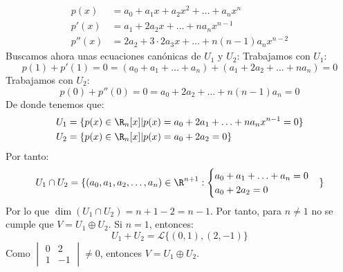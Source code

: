 \begin{ejercicio}
\begin{enumerate}
\begin{align*}
                    p(x) &= a_0 + a_1 x + a_2 x^2 + \ldots + a_n x^n \\
                    p'(x) &= a_1 + 2a_2 x + \ldots + na_n x^{n-1} \\
                    p''(x) &= 2a_2 + 3 \cdot 2 a_3 x + \ldots + n(n-1)a_n x^{n-2}
                \end{align*}
                Buscamos ahora unas ecuaciones canónicas de $U_1$ y $U_2$:
                Trabajamos con $U_1$:
                \begin{equation*}
                    p(1) + p'(1) = 0 = (a_0 + a_1 + \ldots + a_n) + (a_1 + 2a_2 + \ldots + na_n) = 0
                \end{equation*}
                Trabajamos con $U_2$:
                \begin{equation*}
                    p(0) + p''(0) = 0 = a_0 + 2a_2 + \ldots + n(n-1)a_n = 0
                \end{equation*}
                De donde tenemos que:
                \begin{align*}
                    U_1 &= \{p(x) \in \R_n[x] | p(x) = a_0 + 2a_1  + \ldots + na_n x^{n-1} = 0\}
                    \\ U_2 &= \{p(x) \in \R_n[x] | p(x) = a_0 + 2a_2 = 0\}
                \end{align*}
                Por tanto: 
                \begin{equation*}
                    U_1 \cap U_2 = \{ (a_0, a_1, a_2, \ldots, a_n) \in \R^{n+1} : \begin{cases}
                        a_0 + a_1 + \ldots + a_n = 0 \\
                        a_0 + 2a_2 = 0
                    \end{cases}
                    \} 
                \end{equation*}
                Por lo que $ \dim(U_1 \cap U_2) = n + 1 - 2 = n - 1$. Por tanto, para $n \neq 1$ no se cumple que $V = U_1 \oplus U_2$.
                Si $n = 1$, entonces:
                \begin{equation*}
                    U_1 + U_2 = \mathcal{L}\{(0,1), (2,-1)\}
                \end{equation*}
                Como $\begin{vmatrix}
                    0 & 2 \\
                    1 & -1
                \end{vmatrix} \neq 0$, entonces $V = U_1 \oplus U_2$.



\end{enumerate}
\end{ejercicio}
